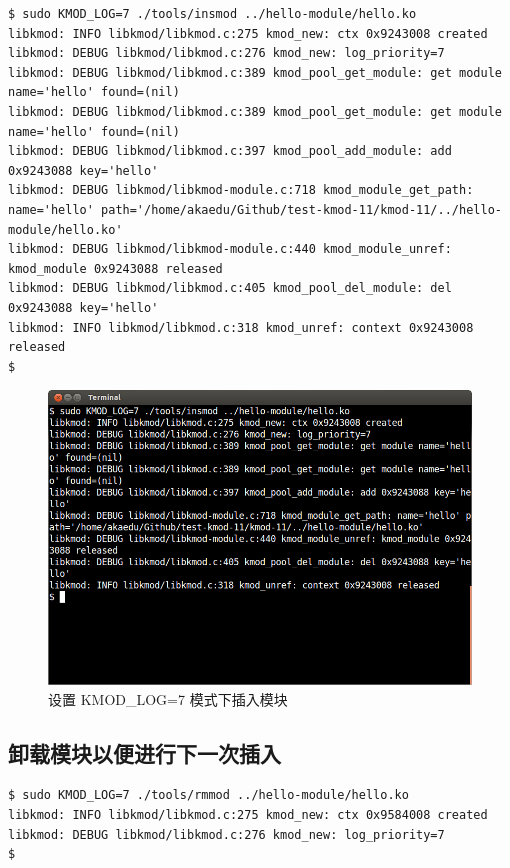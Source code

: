 {\begin{shaded}\begin{verbatim}
$ sudo KMOD_LOG=7 ./tools/insmod ../hello-module/hello.ko
libkmod: INFO libkmod/libkmod.c:275 kmod_new: ctx 0x9243008 created
libkmod: DEBUG libkmod/libkmod.c:276 kmod_new: log_priority=7
libkmod: DEBUG libkmod/libkmod.c:389 kmod_pool_get_module: get module name='hello' found=(nil)
libkmod: DEBUG libkmod/libkmod.c:389 kmod_pool_get_module: get module name='hello' found=(nil)
libkmod: DEBUG libkmod/libkmod.c:397 kmod_pool_add_module: add 0x9243088 key='hello'
libkmod: DEBUG libkmod/libkmod-module.c:718 kmod_module_get_path: name='hello' path='/home/akaedu/Github/test-kmod-11/kmod-11/../hello-module/hello.ko'
libkmod: DEBUG libkmod/libkmod-module.c:440 kmod_module_unref: kmod_module 0x9243088 released
libkmod: DEBUG libkmod/libkmod.c:405 kmod_pool_del_module: del 0x9243088 key='hello'
libkmod: INFO libkmod/libkmod.c:318 kmod_unref: context 0x9243008 released
$ 
\end{verbatim}\end{shaded}}
\begin{figure}[htbp]
\centering
\includegraphics{./pictures/2-3-insmod.png}
\caption{设置 KMOD\_LOG=7 模式下插入模块}
\end{figure}

\subsection{卸载模块以便进行下一次插入}

{\begin{shaded}\begin{verbatim}
$ sudo KMOD_LOG=7 ./tools/rmmod ../hello-module/hello.ko
libkmod: INFO libkmod/libkmod.c:275 kmod_new: ctx 0x9584008 created
libkmod: DEBUG libkmod/libkmod.c:276 kmod_new: log_priority=7
$ 
\end{verbatim}\end{shaded}}

